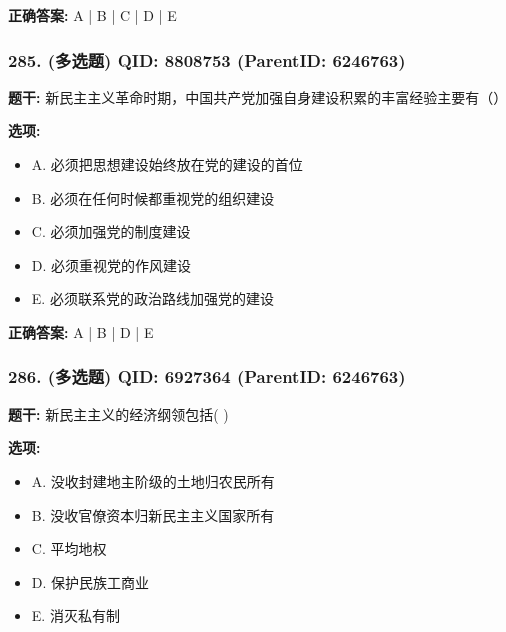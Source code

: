 \documentclass[12pt,UTF8]{ctexart}
\begin{document}
\textbf{正确答案:}
A | B | C | D | E

\vspace{0.3em}\hrulefill\vspace{0.7em}

\subsubsection*{285. (多选题) \small QID: 8808753 (ParentID: 6246763)}

\textbf{题干:}
新民主主义革命时期，中国共产党加强自身建设积累的丰富经验主要有（）



\textbf{选项:}
\begin{itemize}[leftmargin=*]

  \item A. 必须把思想建设始终放在党的建设的首位

  \item B. 必须在任何时候都重视党的组织建设

  \item C. 必须加强党的制度建设

  \item D. 必须重视党的作风建设

  \item E. 必须联系党的政治路线加强党的建设

\end{itemize}

\textbf{正确答案:}
A | B | D | E

\vspace{0.3em}\hrulefill\vspace{0.7em}

\subsubsection*{286. (多选题) \small QID: 6927364 (ParentID: 6246763)}

\textbf{题干:}
新民主主义的经济纲领包括(   )



\textbf{选项:}
\begin{itemize}[leftmargin=*]

  \item A. 没收封建地主阶级的土地归农民所有

  \item B. 没收官僚资本归新民主主义国家所有

  \item C. 平均地权

  \item D. 保护民族工商业

  \item E. 消灭私有制

\end{itemize}
\end{document}
